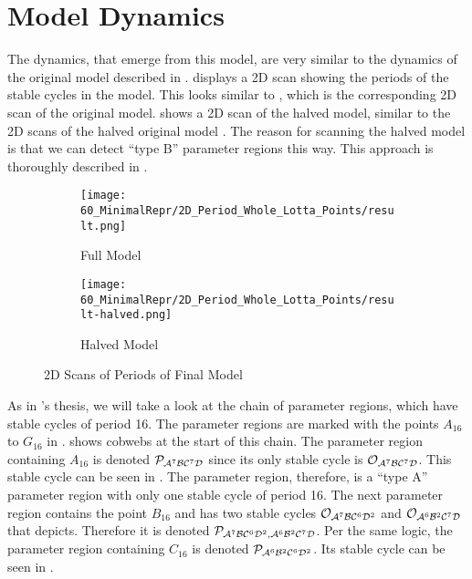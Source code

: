 \section{Model Dynamics}

The dynamics, that emerge from this model, are very similar to the dynamics of the original model described in .
 displays a 2D scan showing the periods of the stable cycles in the model.
This looks similar to , which is the corresponding 2D scan of the original model.
 shows a 2D scan of the halved model, similar to the 2D scans of the halved original model .
The reason for scanning the halved model is that we can detect ``type B'' parameter regions this way.
This approach is thoroughly described in .

\begin{figure}
    \centering
    \begin{subfigure}{0.4\textwidth}
        \centering
        \texttt{[image: 60\_MinimalRepr/2D\_Period\_Whole\_Lotta\_Points/result.png]}
        \caption{Full Model}
        \label{fig:final.period.whole.full}
    \end{subfigure}
    \begin{subfigure}{0.4\textwidth}
        \centering
        \texttt{[image: 60\_MinimalRepr/2D\_Period\_Whole\_Lotta\_Points/result-halved.png]}
        \caption{Halved Model}
        \label{fig:final.period.whole.halved}
    \end{subfigure}
    \caption{2D Scans of Periods of Final Model}
\end{figure}

As in 's thesis, we will take a look at the chain of parameter regions, which have stable cycles of period 16.
The parameter regions are marked with the points $A_{16}$ to $G_{16}$ in .
 shows cobwebs at the start of this chain.
The parameter region containing $A_{16}$ is denoted $\mathcal{P}_{\mathcal{A}^7\mathcal{B}\mathcal{C}^7\mathcal{D}}$ since its only stable cycle is $\mathcal{O}_{\mathcal{A}^7\mathcal{B}\mathcal{C}^7\mathcal{D}}$.
This stable cycle can be seen in .
The parameter region, therefore, is a ``type A'' parameter region with only one stable cycle of period 16.
The next parameter region contains the point $B_{16}$ and has two stable cycles $\mathcal{O}_{\mathcal{A}^7\mathcal{B}\mathcal{C}^6\mathcal{D}^2}$ and $\mathcal{O}_{\mathcal{A}^6\mathcal{B}^2\mathcal{C}^7\mathcal{D}}$ that  depicts.
Therefore it is denoted $\mathcal{P}_{\mathcal{A}^7\mathcal{B}\mathcal{C}^6\mathcal{D}^2, \mathcal{A}^6\mathcal{B}^2\mathcal{C}^7\mathcal{D}}$.
Per the same logic, the parameter region containing $C_{16}$ is denoted $\mathcal{P}_{\mathcal{A}^6\mathcal{B}^2\mathcal{C}^6\mathcal{D}^2}$.
Its stable cycle can be seen in .

